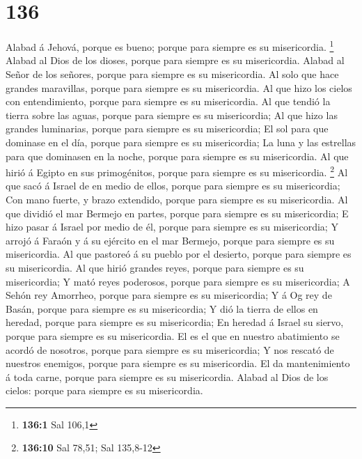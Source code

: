 \hypertarget{section-135}{%
\section{136}\label{section-135}}

 Alabad á Jehová, porque es bueno; porque para siempre es su
misericordia. \footnote{\textbf{136:1} Sal 106,1}  Alabad al
Dios de los dioses, porque para siempre es su misericordia. 
Alabad al Señor de los señores, porque para siempre es su misericordia.
 Al solo que hace grandes maravillas, porque para siempre es
su misericordia.  Al que hizo los cielos con entendimiento,
porque para siempre es su misericordia.  Al que tendió la
tierra sobre las aguas, porque para siempre es su misericordia;
 Al que hizo las grandes luminarias, porque para siempre es
su misericordia;  El sol para que dominase en el día, porque
para siempre es su misericordia;  La luna y las estrellas
para que dominasen en la noche, porque para siempre es su misericordia.
 Al que hirió á Egipto en sus primogénitos, porque para
siempre es su misericordia. \footnote{\textbf{136:10} Sal 78,51; Sal
  135,8-12}  Al que sacó á Israel de en medio de ellos,
porque para siempre es su misericordia;  Con mano fuerte, y
brazo extendido, porque para siempre es su misericordia. 
Al que dividió el mar Bermejo en partes, porque para siempre es su
misericordia;  E hizo pasar á Israel por medio de él,
porque para siempre es su misericordia;  Y arrojó á Faraón
y á su ejército en el mar Bermejo, porque para siempre es su
misericordia.  Al que pastoreó á su pueblo por el desierto,
porque para siempre es su misericordia.  Al que hirió
grandes reyes, porque para siempre es su misericordia;  Y
mató reyes poderosos, porque para siempre es su misericordia;
 A Sehón rey Amorrheo, porque para siempre es su
misericordia;  Y á Og rey de Basán, porque para siempre es
su misericordia;  Y dió la tierra de ellos en heredad,
porque para siempre es su misericordia;  En heredad á
Israel su siervo, porque para siempre es su misericordia. 
El es el que en nuestro abatimiento se acordó de nosotros, porque para
siempre es su misericordia;  Y nos rescató de nuestros
enemigos, porque para siempre es su misericordia.  El da
mantenimiento á toda carne, porque para siempre es su misericordia.
 Alabad al Dios de los cielos: porque para siempre es su
misericordia.

